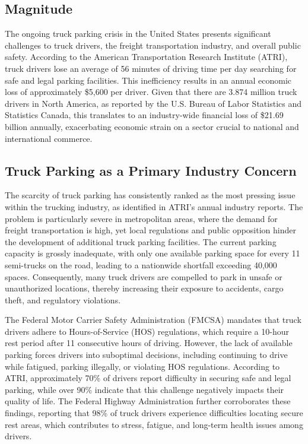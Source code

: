 \documentclass[
  12pt]{article}
\begin{document}
\subsection{Magnitude}\label{magnitude}

The ongoing truck parking crisis in the United States presents
significant challenges to truck drivers, the freight transportation
industry, and overall public safety. According to the American
Transportation Research Institute (ATRI), truck drivers lose an average
of 56 minutes of driving time per day searching for safe and legal
parking facilities. This inefficiency results in an annual economic loss
of approximately \$5,600 per driver. Given that there are 3.874 million
truck drivers in North America, as reported by the U.S. Bureau of Labor
Statistics and Statistics Canada, this translates to an industry-wide
financial loss of \$21.69 billion annually, exacerbating economic strain
on a sector crucial to national and international commerce.

\subsection{Truck Parking as a Primary Industry
Concern}\label{truck-parking-as-a-primary-industry-concern}

The scarcity of truck parking has consistently ranked as the most
pressing issue within the trucking industry, as identified in ATRI's
annual industry reports. The problem is particularly severe in
metropolitan areas, where the demand for freight transportation is high,
yet local regulations and public opposition hinder the development of
additional truck parking facilities. The current parking capacity is
grossly inadequate, with only one available parking space for every 11
semi-trucks on the road, leading to a nationwide shortfall exceeding
40,000 spaces. Consequently, many truck drivers are compelled to park in
unsafe or unauthorized locations, thereby increasing their exposure to
accidents, cargo theft, and regulatory violations.

The Federal Motor Carrier Safety Administration (FMCSA) mandates that
truck drivers adhere to Hours-of-Service (HOS) regulations, which
require a 10-hour rest period after 11 consecutive hours of driving.
However, the lack of available parking forces drivers into suboptimal
decisions, including continuing to drive while fatigued, parking
illegally, or violating HOS regulations. According to ATRI,
approximately 70\% of drivers report difficulty in securing safe and
legal parking, while over 90\% indicate that this challenge negatively
impacts their quality of life. The Federal Highway Administration
further corroborates these findings, reporting that 98\% of truck
drivers experience difficulties locating secure rest areas, which
contributes to stress, fatigue, and long-term health issues among
drivers.
\end{document}

